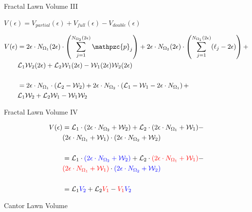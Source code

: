 \documentclass{if-beamer}
\newcommand{\SL}{\mathcal{L}}
\newcommand{\Om}{\Omega}
\newcommand{\W}{\mathcal{W}}
\newcommand{\p}{\mathpzc{p}}
\begin{document}
\begin{frame}{Fractal Lawn Volume III}

$V(\epsilon)=V_{partial}(\epsilon) + V_{full}(\epsilon) - V_{double}(\epsilon)$
\pause
\vspace{0.2in}

	\begin{align*}
	V(\epsilon)&=2\epsilon \cdot N_{\Om_1}(2\epsilon) \cdot \left(\sum_{j=1}^{N_{\Om_2}(2\epsilon)} \p_j \right) + 2\epsilon \cdot N_{\Om_2}(2\epsilon) \cdot \left(\sum_{j=1}^{N_{\Om_1}(2\epsilon)} (\ell_j - 2\epsilon) \right) + \\
	 &\SL_1 \W_2(2\epsilon) + \SL_2 \W_1(2\epsilon) - \W_1(2\epsilon) \W_2(2\epsilon) \\ \\
	&= 2\epsilon \cdot N_{\Om_1} \cdot (\SL_2 - \W_2) + 2\epsilon \cdot N_{\Om_2} \cdot \left( \SL_1 - \W_1 - 2\epsilon \cdot N_{\Om_1} \right) + \\
	 &\SL_1 \W_2 + \SL_2 \W_1 - \W_1 \W_2 
	\end{align*}
\end{frame}

\begin{frame}{Fractal Lawn Volume IV}
	\begin{center}
		\begin{align*}
		V(\epsilon) &= \SL_1 \cdot (2\epsilon \cdot N_{\Om_2} + \W_2) + \SL_2 \cdot (2\epsilon \cdot N_{\Om_1} + \W_1) - \\
		&(2\epsilon \cdot N_{\Om_1} + \W_1) \cdot (2\epsilon \cdot N_{\Om_2} + \W_2) \\ \\
		&= \SL_1 \cdot \textcolor{blue}{(2\epsilon \cdot N_{\Om_2} + \W_2) }+ \SL_2 \cdot \textcolor{red}{(2\epsilon \cdot N_{\Om_1} + \W_1)} - \\
		&\textcolor{red}{(2\epsilon \cdot N_{\Om_1} + \W_1)} \cdot \textcolor{blue}{(2\epsilon \cdot N_{\Om_2} + \W_2)} \\ \\
		&= \SL_1 \textcolor{blue}{V_2} + \SL_2 \textcolor{red}{V_1} - \textcolor{red}{V_1} \textcolor{blue}{V_2}
		\end{align*}
	\end{center}
\end{frame}

\begin{frame}{Cantor Lawn Volume}
	\begin{center}
	\end{center}
\end{frame}
\end{document}

